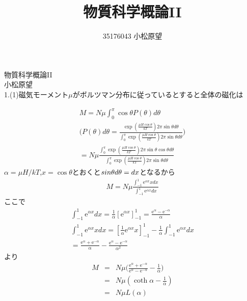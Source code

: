 \documentclass{jsarticle}
\title{物質科学概論II}
\author{35176043 小松原望}
\begin{document}

物質科学概論II\\
 \quad 小松原望\\
1.(1)磁気モーメント$\mu$がボルツマン分布に従っているとすると全体の磁化は

\begin{eqnarray}
M=N\mu\int_0^\pi \cos\theta P(\theta)d\theta\\
\Big(P(\theta)d\theta=\frac{\exp(\frac{\mu H\cos\theta}{kT})2\pi\sin\theta d\theta}{\int_0^\pi \exp(\frac{\mu H\cos\theta}{kT})2\pi\sin\theta d\theta}\Big)\nonumber\\
=N\mu\frac{\int_0^\pi\exp(\frac{\mu H\cos\theta}{kT})2\pi\sin\theta \cos\theta d\theta}{\int_0^\pi \exp(\frac{\mu H\cos\theta}{kT})2\pi\sin\theta d\theta}
\end{eqnarray}
$\alpha=\mu H/kT$,$x=\cos\theta$とおくと$\-sin\theta d\theta=dx$となるから\\
\begin{eqnarray}
M=N\mu\frac{\int_{-1}^1\mathrm{e}^{\alpha x}xdx}{\int_{-1}^1\mathrm{e}^{\alpha x} dx}
\end{eqnarray}
ここで
\begin{eqnarray}
\int_{-1}^1\mathrm{e}^{\alpha x} dx=\frac{1}{\alpha}[\mathrm{e}^{\alpha x}]_{-1}^1=\frac{\mathrm{e}^\alpha - \mathrm{e}^{-\alpha}}{\alpha} \nonumber\\
\int_{-1}^1\mathrm{e}^{\alpha x}xdx=[\frac{1}{\alpha}\mathrm{e}^{\alpha x}x]_{-1}^1-\frac{1}{\alpha}\int_{-1}^1\mathrm{e}^{\alpha x}dx \nonumber\\
=\frac{\mathrm{e}^\alpha+\mathrm{e}^{-\alpha}}{\alpha}-\frac{\mathrm{e}^\alpha - \mathrm{e}^{-\alpha}}{\alpha^2}\nonumber
\end{eqnarray}
より
\begin{eqnarray}
M&=&N\mu\Big(\frac{\mathrm{e}^\alpha+\mathrm{e}^{-\alpha}}{\mathrm{e}^{\alpha}-\mathrm{e}^{-\alpha}}-\frac{1}{\alpha}\Big)\\
&=&N\mu(\coth \alpha -\frac{1}{\alpha})\nonumber\\
&=&N\mu L(\alpha)
\end{eqnarray}
\end{document}
